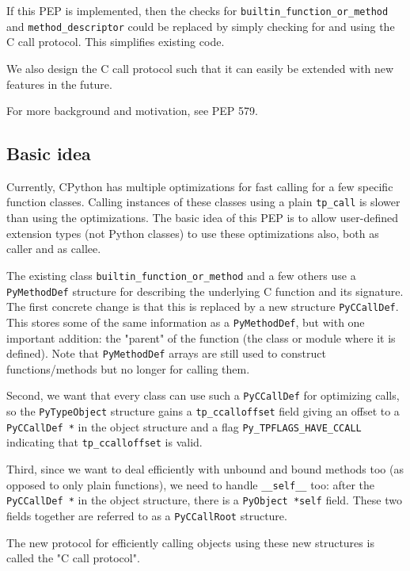 If this PEP is implemented, then the checks for
\texttt{builtin\_function\_or\_method} and \texttt{method\_descriptor}
could be replaced by simply checking for and using the C call protocol.
This simplifies existing code.

We also design the C call protocol such that it can easily be extended
with new features in the future.

For more background and motivation, see PEP 579.

\subsection{Basic idea}

Currently, CPython has multiple optimizations for fast calling for a few
specific function classes. Calling instances of these classes using a
plain \texttt{tp\_call} is slower than using the optimizations. The
basic idea of this PEP is to allow user-defined extension types (not
Python classes) to use these optimizations also, both as caller and as
callee.

The existing class \texttt{builtin\_function\_or\_method} and a few
others use a \texttt{PyMethodDef} structure for describing the
underlying C function and its signature. The first concrete change is
that this is replaced by a new structure \texttt{PyCCallDef}. This
stores some of the same information as a \texttt{PyMethodDef}, but with
one important addition: the "parent" of the function (the class or
module where it is defined). Note that \texttt{PyMethodDef} arrays are
still used to construct functions/methods but no longer for calling
them.

Second, we want that every class can use such a \texttt{PyCCallDef} for
optimizing calls, so the \texttt{PyTypeObject} structure gains a
\texttt{tp\_ccalloffset} field giving an offset to a
\texttt{PyCCallDef\ *} in the object structure and a flag
\texttt{Py\_TPFLAGS\_HAVE\_CCALL} indicating that
\texttt{tp\_ccalloffset} is valid.

Third, since we want to deal efficiently with unbound and bound methods
too (as opposed to only plain functions), we need to handle
\texttt{\_\_self\_\_} too: after the \texttt{PyCCallDef\ *} in the
object structure, there is a \texttt{PyObject\ *self} field. These two
fields together are referred to as a \texttt{PyCCallRoot} structure.

The new protocol for efficiently calling objects using these new
structures is called the "C call protocol".


